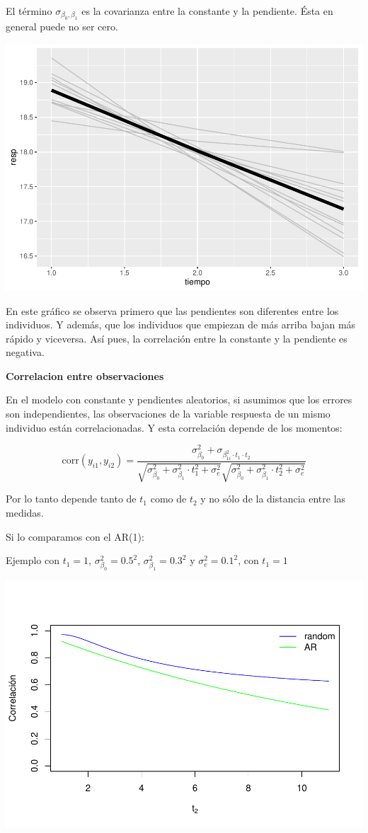 \documentclass[
]{book}
\begin{document}
El término \(\sigma_{\beta_0,\beta_1}\) es la covarianza entre la constante y la pendiente. Ésta en general puede no ser cero.

\includegraphics{fig_out/unnamed-chunk-71-1.pdf}

En este gráfico se observa primero que las pendientes son diferentes entre los individuos. Y además, que los individuos que empiezan de más arriba bajan más rápido y viceversa. Así pues, la correlación entre la constante y la pendiente es negativa.

\textbf{Correlacion entre observaciones}

En el modelo con constante y pendientes aleatorios, si asumimos que los errores son independientes, las observaciones de la variable respuesta de un mismo individuo están correlacionadas. Y esta correlación depende de los momentos:

\[\text{corr}(y_{i1},y_{i2}) = \frac{\sigma_{\beta_{0}}^2+\sigma_{\beta_{1i}^2 \cdot t_1 \cdot t_2}}{\sqrt{\sigma_{\beta_{0}}^2+\sigma_{\beta_{1}}^2 \cdot t_1^2 + \sigma_e^2}\sqrt{\sigma_{\beta_{0}}^2+\sigma_{\beta_{1}}^2 \cdot t_2^2 + \sigma_e^2}}\]

Por lo tanto depende tanto de \(t_1\) como de \(t_2\) y no sólo de la distancia entre las medidas.

Si lo comparamos con el AR(1):

Ejemplo con \(t_1=1\), \(\sigma_{\beta_{0}}^2=0.5^2\), \(\sigma_{\beta_{1}}^2=0.3^2\) y \(\sigma_{e}^2=0.1^2\), con \(t_1=1\)

\includegraphics{fig_out/unnamed-chunk-72-1.pdf}
\end{document}

